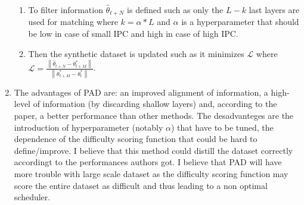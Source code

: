 \documentclass[onecolumn]{IEEEtran}
\begin{document}
\begin{enumerate}[label=(\alph*)]
\begin{enumerate}[label=(\arabic*)]
        \item To filter information $\hat\theta_{t+N}$ is defined such as only the $L-k$ last layers are used for matching where $k=\alpha*L$ and $\alpha$ is a hyperparameter that should be low in case of small IPC and high in case of high IPC.
        \item Then the synthetic dataset is updated such as it minimizes $\mathcal{L}$ where $\mathcal{L}=\frac{\left\|\hat\theta_{t+N}-\theta^*_{t+M}\right\|}{\left\|\theta^*_{t+M}-\theta^*_t\right\|}$.
    \end{enumerate}
    \vspace{3mm}
    \item The advantages of PAD are: an improved alignment of information, a high-level of information (by discarding shallow layers) and, according to the paper, a better performance than other methods. The desadvanteges are the introduction of hyperparameter (notably $\alpha$) that have to be tuned, the dependence of the difficulty scoring function that could be hard to define/improve. I believe that this method could distill the dataset correctly accordingt to the performances authors got. I believe that PAD will have more trouble with large scale dataset as the difficulty scoring function may score the entire dataset as difficult and thus leading to a non optimal scheduler.
\end{enumerate}



\end{document}
